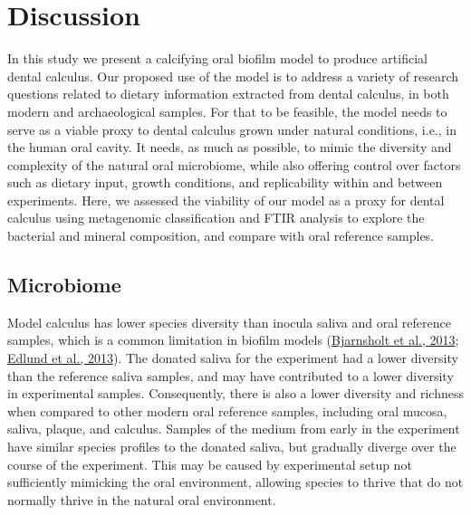 \documentclass[
  letterpaper,
]{book}
\begin{document}
\hypertarget{discussion}{%
\section{Discussion}\label{discussion}}

In this study we present a calcifying oral biofilm model to produce
artificial dental calculus. Our proposed use of the model is to address
a variety of research questions related to dietary information extracted
from dental calculus, in both modern and archaeological samples. For
that to be feasible, the model needs to serve as a viable proxy to
dental calculus grown under natural conditions, i.e., in the human oral
cavity. It needs, as much as possible, to mimic the diversity and
complexity of the natural oral microbiome, while also offering control
over factors such as dietary input, growth conditions, and replicability
within and between experiments. Here, we assessed the viability of our
model as a proxy for dental calculus using metagenomic classification
and FTIR analysis to explore the bacterial and mineral composition, and
compare with oral reference samples.

\hypertarget{microbiome}{%
\subsection{Microbiome}\label{microbiome}}

Model calculus has lower species diversity than inocula saliva and oral
reference samples, which is a common limitation in biofilm models
(\protect\hyperlink{ref-bjarnsholtVivoBiofilm2013}{Bjarnsholt et al.,
2013}; \protect\hyperlink{ref-edlundBiofilmModel2013}{Edlund et al.,
2013}). The donated saliva for the experiment had a lower diversity than
the reference saliva samples, and may have contributed to a lower
diversity in experimental samples. Consequently, there is also a lower
diversity and richness when compared to other modern oral reference
samples, including oral mucosa, saliva, plaque, and calculus. Samples of
the medium from early in the experiment have similar species profiles to
the donated saliva, but gradually diverge over the course of the
experiment. This may be caused by experimental setup not sufficiently
mimicking the oral environment, allowing species to thrive that do not
normally thrive in the natural oral environment.
\end{document}
